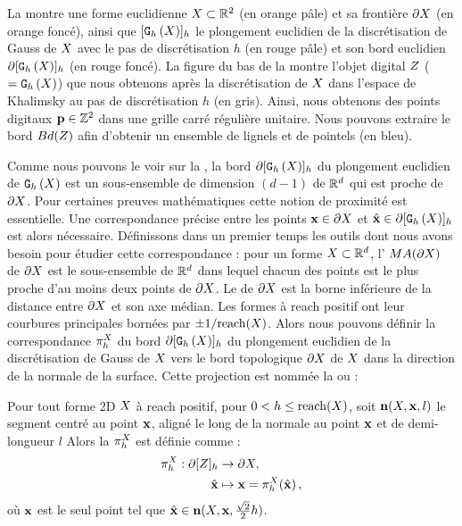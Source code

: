 La  montre une forme euclidienne $X \subset \mathbb{R}^2$
(en orange pâle) et sa frontière $\partial X$ (en orange foncé), ainsi que
$\lbrack \mathtt{G}_{h}\left(X\right) \rbrack_{h}$ le plongement euclidien de la discrétisation de Gauss de
$X$ avec le pas de discrétisation $h$ (en rouge pâle) et son bord euclidien
$\partial\lbrack \mathtt{G}_{h}\left(X\right) \rbrack_{h}$ (en rouge foncé). La figure du bas de la
 montre l'objet digital $Z$ ($= \mathtt{G}_{h}\left(X\right)$) que nous
obtenons après la discrétisation de $X$ dans l'espace de Khalimsky au pas
de discrétisation $h$ (en gris). Ainsi, nous obtenons des points digitaux $\mathbf{p}
\in \mathbb{Z}^2$ dans une grille carré régulière unitaire. Nous pouvons extraire le
bord $Bd(Z)$ afin d'obtenir un ensemble de lignels et de
pointels (en bleu).


Comme nous pouvons le voir sur la , la bord
$\partial\lbrack \mathtt{G}_{h}\left(X\right) \rbrack_{h}$ du plongement euclidien de $\mathtt{G}_{h}\left(X\right)$ est un sous-ensemble
de dimension $(d-1)$ de $\mathbb{R}^d$ qui est proche de $\partial X$. Pour
certaines preuves mathématiques cette notion de proximité est essentielle. Une
correspondance précise entre les points $\mathbf{x} \in \partial X$ et $\hat{\mathbf{x}}\in
\partial\lbrack \mathtt{G}_{h}\left(X\right) \rbrack_{h}$ est alors nécessaire. Définissons dans un premier temps
les outils dont nous avons besoin pour étudier cette correspondance : pour un
forme $X \subset \mathbb{R}^d$, l' $MA(\partial X)$ de $\partial X$ est le
sous-ensemble de $\mathbb{R}^d$ dans lequel chacun des points est le plus proche d'au
moins deux points de $\partial X$. Le  de $\partial X$ est la borne
inférieure de la distance entre $\partial X$ et son axe médian. Les formes à reach
positif ont leur courbures principales bornées par $\pm 1 / \mathrm{reach}(X)$.
%
%
Alors nous pouvons définir la correspondance $\pi_h^{X}$ du bord
$\partial\lbrack \mathtt{G}_{h}\left(X\right) \rbrack_{h}$ du plongement euclidien de la discrétisation de Gauss
de $X$ vers le bord topologique $\partial X$ de $X$ dans la direction de la
normale de la surface. Cette projection est nommée la  ou  \cite{Lachaud2006HDR} :
%
\begin{definition}{}
\label{def:projection}
%
  Pour tout forme 2D $X$ à reach positif, pour $0 < h \le \mathrm{reach}(X)$,
  soit $\mathbf{n}(X,\mathbf{x},l)$ le segment centré au point $\mathbf{x}$, aligné le
  long de la normale au point $\mathbf{x}$ et de demi-longueur $l$ Alors la
   $\pi_h^{X}$ est définie comme :
  \begin{align}
    \pi_h^{X}: \partial\lbrack Z \rbrack_{h} &\rightarrow \partial X, \nonumber \\
    \hat{\mathbf{x}} &\mapsto \mathbf{x}=\pi_h^{X}(\hat{\mathbf{x}}) \,,
  \end{align}
  où $\mathbf{x}$ est le seul point tel que $\hat{\mathbf{x}} \in
  \mathbf{n}(X,\mathbf{x},\frac{\sqrt{2}}{2}h)$.
%
\end{definition}
